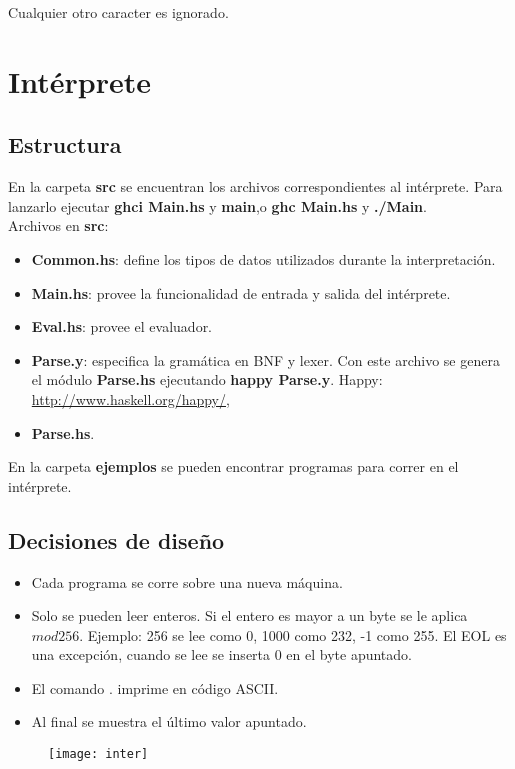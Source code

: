 \documentclass[a4paper, 12pt]{article}
\begin{document}
Cualquier otro caracter es ignorado.
\section*{Intérprete}

\subsection*{Estructura}
En la carpeta \textbf{src} se encuentran los archivos correspondientes al intérprete. Para lanzarlo
ejecutar \textbf{ghci Main.hs} y \textbf{main},o \textbf{ghc Main.hs} y \textbf{./Main}. \\
Archivos en \textbf{src}:
\begin{itemize}
	\item \textbf{Common.hs}: define los tipos de datos utilizados durante la interpretación.
	\item \textbf{Main.hs}: provee la funcionalidad de entrada y salida del intérprete.
	\item \textbf{Eval.hs}: provee el evaluador.
	\item \textbf{Parse.y}: especifica la gramática en BNF y lexer. Con este archivo se genera el módulo \textbf{Parse.hs} ejecutando \textbf{happy Parse.y}.
	Happy: \url{http://www.haskell.org/happy/},  
	\item \textbf{Parse.hs}.
\end{itemize}

En la carpeta \textbf{ejemplos} se pueden encontrar programas para correr en el intérprete. \\


\subsection*{Decisiones de diseño}
\begin{itemize}
	\item Cada programa se corre sobre una nueva máquina.
	\item Solo se pueden leer enteros. Si el entero es mayor a un byte se le aplica $mod 256$. Ejemplo: 256
	se lee como 0, 1000 como 232, -1 como 255. El EOL es una excepción, cuando se lee se inserta 0 en el byte apuntado.
	\item El comando . imprime en código ASCII.
	\item Al final se muestra el último valor apuntado.
\end{itemize}

\begin{figure}[h]
\texttt{[image: inter]}
\centering
\end{figure}
\end{document}
